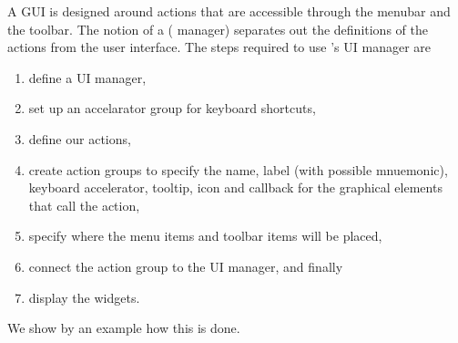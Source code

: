 A GUI is designed around actions that are accessible through the
menubar and the toolbar. The notion of a 
( manager) separates out the definitions of the actions
from the user interface. The steps required to use \GTK's UI manager
are 
\begin{enumerate}
\item define a UI manager,
\item  set up an accelarator group for
keyboard shortcuts,
\item define our actions,
\item create action groups to
specify the name, label (with possible mnuemonic), keyboard
accelerator, tooltip, icon and callback for the graphical elements
that call the action,
\item specify where the menu items and toolbar
items will be placed,
\item connect the action group to the UI manager,
and finally
\item display the widgets.
\end{enumerate}

We show by an example how this is done. 

